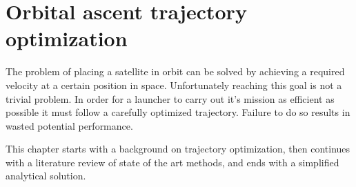 \chapter{Orbital ascent trajectory optimization}

The problem of placing a satellite in orbit can be solved by achieving a required velocity at a certain position in space. Unfortunately reaching this goal is not a trivial problem. In order for a launcher to carry out it's mission as efficient as possible it must follow a carefully optimized trajectory. Failure to do so results in wasted potential performance.

This chapter starts with a background on trajectory optimization, then continues with a literature review of state of the art methods, and ends with a simplified analytical solution.




